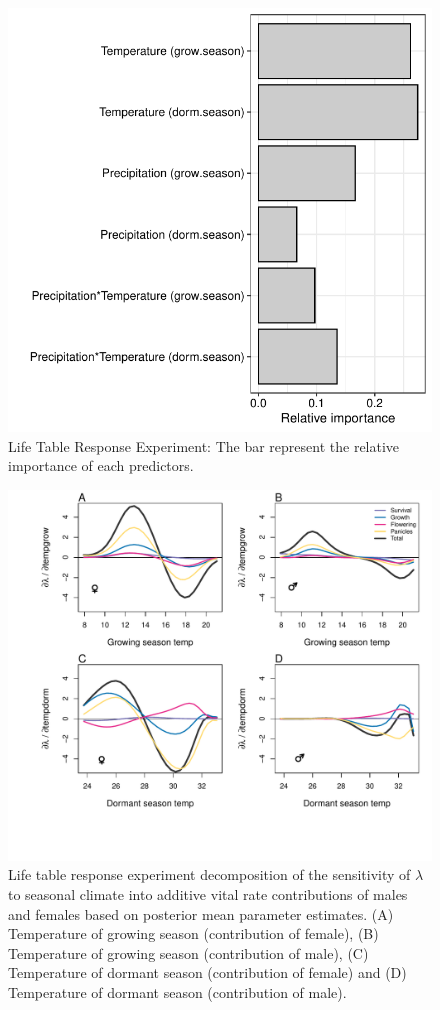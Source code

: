 \documentclass[12pt]{article}\usepackage[]{graphicx}\usepackage[dvipsnames]{xcolor}
\begin{document}
\begin{figure}[H]
	\begin{center}
		\includegraphics[width=0.65\linewidth]{Figures/Fig_LTRE.pdf}
		\caption{Life Table Response Experiment: The bar represent the relative importance of each predictors.}
		\label{Sup:LTRE}
	\end{center}
\end{figure}

\begin{figure}[H]
	\begin{center}
		\includegraphics[width=0.95\linewidth]{Figures/LTRE_Temperature.pdf}
		\caption{Life table response experiment decomposition of the sensitivity of $\lambda$ to seasonal climate into additive vital rate contributions of males and females based on posterior mean parameter estimates.
			(A) Temperature of growing season (contribution of female), (B) Temperature of growing season (contribution of male),  (C) Temperature of dormant season (contribution of female) and (D) Temperature of dormant season (contribution of male).}
		\label{Sup:LTRETemp}
	\end{center}
\end{figure}
\end{document}
